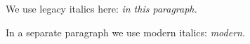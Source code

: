 We use legacy italics here: \it in this paragraph.

In a separate paragraph we use modern italics: \textit{modern}.

